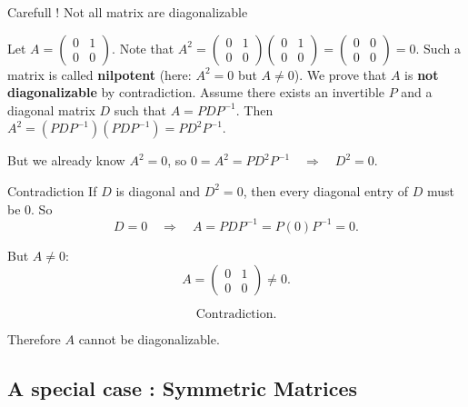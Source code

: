 \documentclass[aspectratio=169]{beamer}
\begin{document}
\begin{frame}{Carefull ! Not all matrix are diagonalizable}

Let
$
A =
\begin{pmatrix}
0 & 1\\
0 & 0
\end{pmatrix}.
$
Note that
$
A^2 =
\begin{pmatrix}
0 & 1\\
0 & 0
\end{pmatrix}
\begin{pmatrix}
0 & 1\\
0 & 0
\end{pmatrix}
=
\begin{pmatrix}
0 & 0\\
0 & 0
\end{pmatrix}
= 0.
$
Such a matrix is called \textbf{nilpotent} (here: $A^2 = 0$ but $A \neq 0$).
\pause
We prove that $A$ is \textbf{not diagonalizable} by contradiction.
\pause
\medskip
Assume there exists an invertible $P$ and a diagonal matrix $D$ such that
$
A = P D P^{-1}.
$
Then
$
A^2 = (P D P^{-1})(P D P^{-1}) = P D^2 P^{-1}.
$

But we already know $A^2 = 0$, so
$
0 = A^2 = P D^2 P^{-1}
\quad \Longrightarrow \quad
D^2 = 0.
$

\pause

\begin{block}{Contradiction}
If $D$ is diagonal and $D^2 = 0$, then every diagonal entry of $D$ must be $0$.
So
\[
D = 0
\quad \Longrightarrow \quad
A = P D P^{-1} = P (0) P^{-1} = 0.
\]

But $A \neq 0$:
\[
A =
\begin{pmatrix}
0 & 1\\
0 & 0
\end{pmatrix}
\neq 0.
\]

\[
\text{Contradiction.}
\]

Therefore $A$ cannot be diagonalizable.
\end{block}

\end{frame}

\subsection{A special case : Symmetric Matrices}
\end{document}
